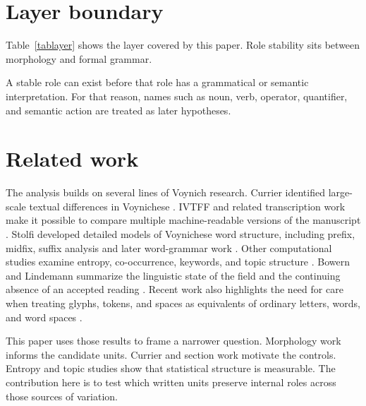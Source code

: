 \documentclass[11pt]{article}
\begin{document}
\section{Layer boundary}

Table~\ref{tablayer} shows the layer covered by this paper. Role stability sits between morphology and formal grammar.

\begin{table}[H]
\centering
\caption{Layer boundary for the present paper}
\label{tablayer}

\end{table}

A stable role can exist before that role has a grammatical or semantic interpretation. For that reason, names such as noun, verb, operator, quantifier, and semantic action are treated as later hypotheses.

\section{Related work}

The analysis builds on several lines of Voynich research. Currier identified large-scale textual differences in Voynichese \cite{currier_1976}. IVTFF and related transcription work make it possible to compare multiple machine-readable versions of the manuscript \cite{zandbergen_transcription}. Stolfi developed detailed models of Voynichese word structure, including prefix, midfix, suffix analysis and later word-grammar work \cite{stolfi_pms_1997,stolfi_word_grammar_2000}. Other computational studies examine entropy, co-occurrence, keywords, and topic structure \cite{reddy_knight_2011,montemurro_zanette_2013,sterneck_topic_2021}. Bowern and Lindemann summarize the linguistic state of the field and the continuing absence of an accepted reading \cite{bowern_lindemann_2021}. Recent work also highlights the need for care when treating glyphs, tokens, and spaces as equivalents of ordinary letters, words, and word spaces \cite{parisel_units_2026}.

This paper uses those results to frame a narrower question. Morphology work informs the candidate units. Currier and section work motivate the controls. Entropy and topic studies show that statistical structure is measurable. The contribution here is to test which written units preserve internal roles across those sources of variation.

\begin{table}[H]
\centering
\caption{Relationship to prior structural work}
\label{tabprior}
\resizebox{\linewidth}{!}{}
\end{table}
\end{document}
